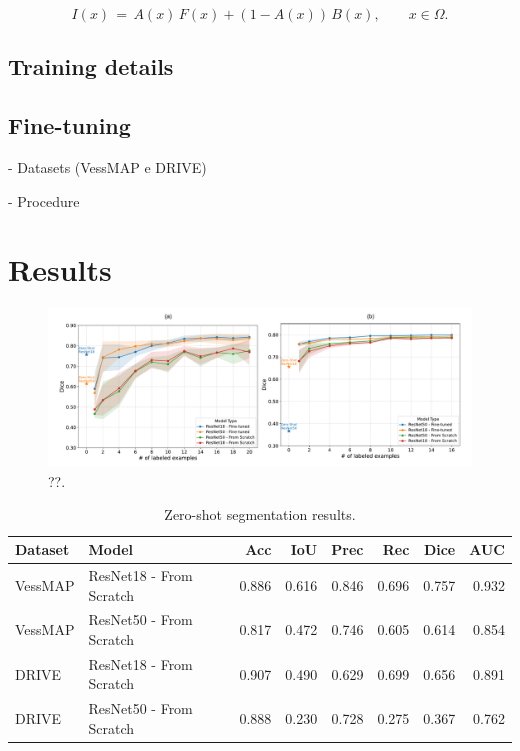 \documentclass[%
reprint,
nofootinbib,
 amsmath,amssymb,
aps,
superscriptaddress,
showkeys,
longbibliography
]{revtex4-1}
\begin{document}
\begin{equation}
I(x) \,=\, A(x)\,F(x) + (1-A(x))\,B(x), \qquad x \in \Omega.
\label{eq:compose}
\end{equation}





\subsection{Training details}

\subsection{Fine-tuning}

- Datasets (VessMAP e DRIVE)

- Procedure

\section{Results}
\label{s:results}

\begin{figure}[tbp]
    \centering
    \includegraphics[width=\textwidth]{figures/results/results_charts.pdf}
    \caption{??.}
    \label{f:results_charts}
\end{figure}


\begin{table}[t]
\caption{Zero-shot segmentation results.}
\label{tab:zero_shot_results}
\centering
\begingroup
\small
\setlength{\tabcolsep}{3pt}
\renewcommand{\arraystretch}{1.15}
\begin{tabularx}{\textwidth}{l X r r r r r r}
\hline
	\textbf{Dataset} & \textbf{Model} & \textbf{Acc} & \textbf{IoU} & \textbf{Prec} & \textbf{Rec} & \textbf{Dice} & \textbf{AUC} \\
\hline
VessMAP & ResNet18 - From Scratch & 0.886 & 0.616 & 0.846 & 0.696 & 0.757 & 0.932 \\
VessMAP & ResNet50 - From Scratch & 0.817 & 0.472 & 0.746 & 0.605 & 0.614 & 0.854 \\
\hline
DRIVE & ResNet18 - From Scratch & 0.907 & 0.490 & 0.629 & 0.699 & 0.656 & 0.891 \\
DRIVE & ResNet50 - From Scratch & 0.888 & 0.230 & 0.728 & 0.275 & 0.367 & 0.762 \\
\hline
\end{tabularx}
\endgroup
\end{table}
\end{document}

